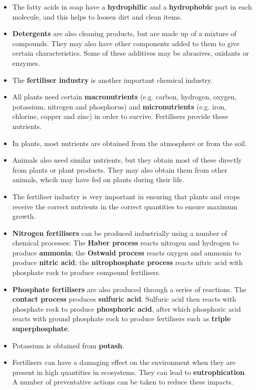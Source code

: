 \begin{itemize}
\item{The fatty acids in soap have a \textbf{hydrophilic} and a \textbf{hydrophobic} part in each molecule, and this helps to loosen dirt and clean items.}
\item{\textbf{Detergents} are also cleaning products, but are made up of a mixture of compounds. They may also have other components added to them to give certain characteristics. Some of these additives may be abrasives, oxidants or enzymes.}
\item{The \textbf{fertiliser industry} is another important chemical industry.}
\item{All plants need certain \textbf{macronutrients} (e.g. carbon, hydrogen, oxygen, potassium, nitrogen and phosphorus) and \textbf{micronutrients} (e.g. iron, chlorine, copper and zinc) in order to survive. Fertilisers provide these nutrients.}
\item{In plants, most nutrients are obtained from the atmosphere or from the soil.}
\item{Animals also need similar nutrients, but they obtain most of these directly from plants or plant products. They may also obtain them from other animals, whcih may have fed on plants during their life.}
\item{The fertiliser industry is very important in ensuring that plants and crops receive the correct nutrients in the correct quantities to ensure maximum growth.} 
\item{\textbf{Nitrogen fertilisers} can be produced industrially using a number of chemical processes: The \textbf{Haber process} reacts nitrogen and hydrogen to produce \textbf{ammonia}; the \textbf{Ostwald process} reacts oxygen and ammonia to produce \textbf{nitric acid}; the \textbf{nitrophosphate process} reacts nitric acid with phosphate rock to produce compound fertilisers.}
\item{\textbf{Phosphate fertilisers} are also produced through a series of reactions. The \textbf{contact process} produces \textbf{sulfuric acid}. Sulfuric acid then reacts with phosphate rock to produce \textbf{phosphoric acid}, after which phosphoric acid reacts with ground phosphate rock to produce fertilisers such as \textbf{triple superphosphate}.}
\item{Potassium is obtained from \textbf{potash}.}
\item{Fertilisers can have a damaging effect on the environment when they are present in high quantities in ecosystems. They can lead to \textbf{eutrophication}. A number of preventative actions can be taken to reduce these impacts.}

\end{itemize}
